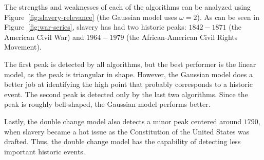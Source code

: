 The strengths and weaknesses of each of the algorithms can be analyzed using Figure~\ref{fig:slavery-relevance} (the Gaussian model uses $\omega = 2$). As can be seen in Figure~\ref{fig:war-series}, slavery has had two historic peaks: $1842 - 1871$ (the American Civil War) and $1964 - 1979$ (the African-American Civil Rights Movement).

The first peak is detected by all algorithms, but the best performer is the linear model, as the peak is triangular in shape. However, the Gaussian model does a better job at identifying the high point that probably corresponds to a historic event. The second peak is detected only by the last two algorithms. Since the peak is roughly bell-shaped, the Gaussian model performs better.

Lastly, the double change model also detects a minor peak centered around $1790$, when slavery became a hot issue as the Constitution of the United States was drafted. Thus, the double change model has the capability of detecting less important historic events.
